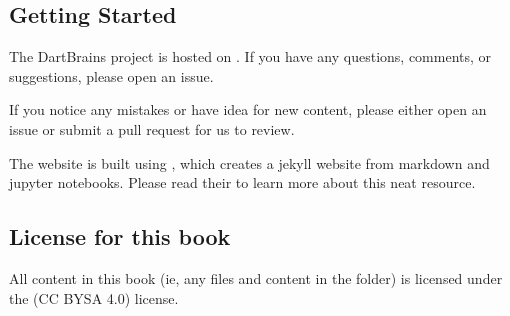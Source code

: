 \documentclass[letterpaper,10pt,english]{sphinxmanual}
\begin{document}
\subsection{Getting Started}
\label{\detokenize{content/Contributing:getting-started}}
The DartBrains project is hosted on . If you have any questions, comments, or suggestions, please open an issue.

If you notice any mistakes or have idea for new content, please either open an issue or submit a pull request for us to review.

The website is built using , which creates a jekyll website from markdown and jupyter notebooks. Please read their  to learn more about this neat resource.


\subsection{License for this book}
\label{\detokenize{content/Contributing:license-for-this-book}}
All content in this book (ie, any files and content in the  folder)
is licensed under the 
(CC BY\sphinxhyphen{}SA 4.0) license.







\renewcommand{\indexname}{Index}
\printindex
\end{document}
